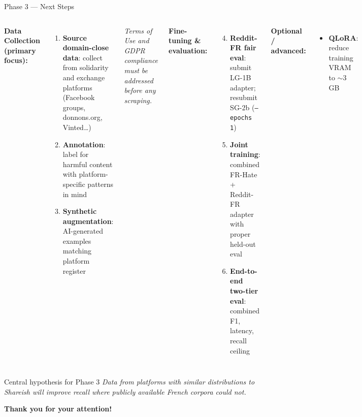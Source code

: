 \documentclass[aspectratio=169, 12pt]{beamer}
\begin{document}
\begin{frame}[shrink=25]{Phase 3 — Next Steps}
  \begin{columns}[T]
      \textbf{Data Collection (primary focus):}
      \begin{enumerate}
        \item \textbf{Source domain-close data}: collect from solidarity and exchange platforms (Facebook groups, donnons.org, Vinted…)
        \item \textbf{Annotation}: label for harmful content with platform-specific patterns in mind
        \item \textbf{Synthetic augmentation}: AI-generated examples matching platform register
      \end{enumerate}
      \vspace{3pt}
      \scriptsize\textit{Terms of Use and GDPR compliance must be addressed before any scraping.
      }\normalsize

      \textbf{Fine-tuning \& evaluation:}
      \begin{enumerate}
        \setcounter{enumi}{3}
        \item \textbf{Reddit-FR fair eval}: submit LG-1B adapter; resubmit SG-2b (\texttt{--epochs 1})
        \item \textbf{Joint training}: combined FR-Hate + Reddit-FR adapter with proper held-out eval
        \item \textbf{End-to-end two-tier eval}: combined F1, latency, recall ceiling
      \end{enumerate}

      \vspace{0.3em}
      \textbf{Optional / advanced:}
      \begin{itemize}
        \color{gray}
        \item \textbf{QLoRA}: reduce training VRAM to $\sim$3 GB
        
      \end{itemize}
  \end{columns}
  \vspace{6pt}
  \begin{block}{Central hypothesis for Phase 3}
    \small\emph{Data from platforms with similar distributions to Shareish will improve recall where publicly available French corpora could not.}
  \end{block}
  \vspace{6pt}
  \centering
  \large\textbf{Thank you for your attention!}
\end{frame}
\end{document}
